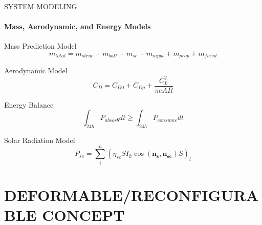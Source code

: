 \documentclass{beamer}
\begin{document}
\begin{frame}{SYSTEM MODELING}
    \framesubtitle{Mass, Aerodynamic, and Energy Models}
    
    \begin{block}{Mass Prediction Model}
    \begin{equation*}
        m_{total} = m_{struc} + m_{batt} + m_{sc} + m_{mppt} + m_{prop} + m_{fixed}
    \end{equation*}
    \end{block}
    
    \begin{block}{Aerodynamic Model}
    \begin{equation*}
        C_D = C_{D0} + C_{Dp} + \frac{C_L^2}{\pi eAR}
    \end{equation*}
    \end{block}
    
    \vspace{-0.2cm}
    \begin{block}{Energy Balance}
    \begin{equation*}
        \int_{24h} P_{absorb}dt \geq \int_{24h} P_{consume}dt
    \end{equation*}
    \end{block}
    
    \vspace{-0.2cm}
    \begin{block}{Solar Radiation Model}
    \begin{equation*}
        P_{sc} = \sum_i^n (\eta_{sc} SI_h \cos(\mathbf{n_s}, \mathbf{n_{sc}}) S)_i
    \end{equation*}
    \end{block}
\end{frame}

\section{DEFORMABLE/RECONFIGURABLE CONCEPT}
\end{document}
